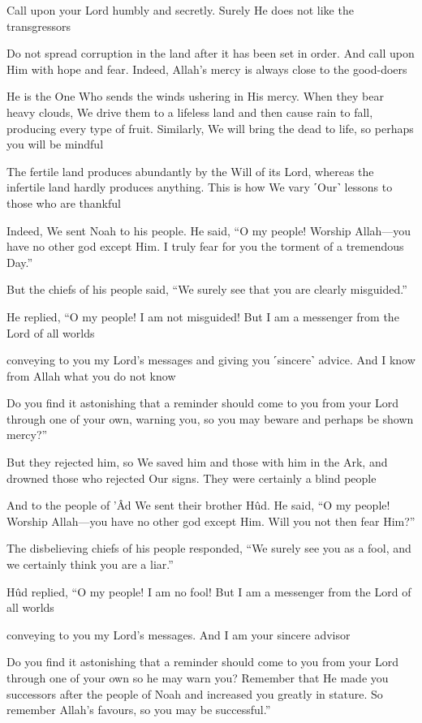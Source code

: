 Call upon your Lord humbly and secretly. Surely He does not like the transgressors

Do not spread corruption in the land after it has been set in order. And call upon Him with hope and fear. Indeed, Allah’s mercy is always close to the good-doers

He is the One Who sends the winds ushering in His mercy. When they bear heavy clouds, We drive them to a lifeless land and then cause rain to fall, producing every type of fruit. Similarly, We will bring the dead to life, so perhaps you will be mindful

The fertile land produces abundantly by the Will of its Lord, whereas the infertile land hardly produces anything. This is how We vary ˹Our˺ lessons to those who are thankful

Indeed, We sent Noah to his people. He said, “O my people! Worship Allah—you have no other god except Him. I truly fear for you the torment of a tremendous Day.”

But the chiefs of his people said, “We surely see that you are clearly misguided.”

He replied, “O my people! I am not misguided! But I am a messenger from the Lord of all worlds

conveying to you my Lord’s messages and giving you ˹sincere˺ advice. And I know from Allah what you do not know

Do you find it astonishing that a reminder should come to you from your Lord through one of your own, warning you, so you may beware and perhaps be shown mercy?”

But they rejected him, so We saved him and those with him in the Ark, and drowned those who rejected Our signs. They were certainly a blind people

And to the people of ’Âd We sent their brother Hûd. He said, “O my people! Worship Allah—you have no other god except Him. Will you not then fear Him?”

The disbelieving chiefs of his people responded, “We surely see you as a fool, and we certainly think you are a liar.”

Hûd replied, “O my people! I am no fool! But I am a messenger from the Lord of all worlds

conveying to you my Lord’s messages. And I am your sincere advisor

Do you find it astonishing that a reminder should come to you from your Lord through one of your own so he may warn you? Remember that He made you successors after the people of Noah and increased you greatly in stature. So remember Allah’s favours, so you may be successful.”

